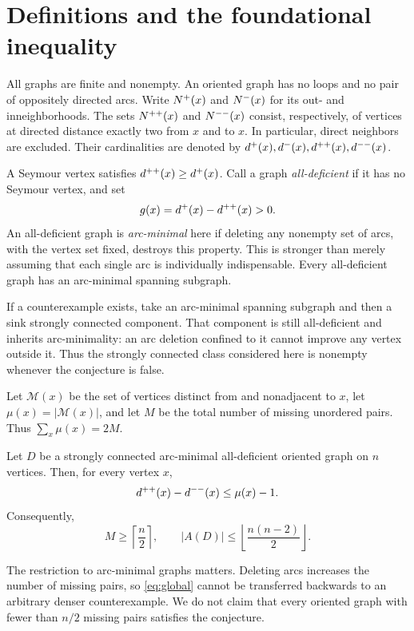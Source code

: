 \section{Definitions and the foundational inequality}

All graphs are finite and nonempty. An oriented graph has no loops and
no pair of oppositely directed arcs. Write $N^+(x)$ and $N^-(x)$ for
its out- and inneighborhoods. The sets $N^{++}(x)$ and $N^{--}(x)$ consist,
respectively, of vertices at directed distance exactly two from $x$ and
to $x$. In particular, direct neighbors are excluded. Their cardinalities
are denoted by $d^+(x),d^-(x),d^{++}(x),d^{--}(x)$.

A Seymour vertex satisfies $d^{++}(x)\ge d^+(x)$. Call a graph
\emph{all-deficient} if it has no Seymour vertex, and set
\[
g(x)=d^+(x)-d^{++}(x)>0.
\]
An all-deficient graph is \emph{arc-minimal} here if deleting any nonempty
set of arcs, with the vertex set fixed, destroys this property.
This is stronger than merely assuming that each single arc is
individually indispensable. Every all-deficient graph has an
arc-minimal spanning subgraph.

If a counterexample exists, take an arc-minimal spanning subgraph and
then a sink strongly connected component. That component is still
all-deficient and inherits arc-minimality: an arc deletion confined to it
cannot improve any vertex outside it. Thus the strongly connected class
considered here is nonempty whenever the conjecture is false.

Let $\mathcal M(x)$ be the set of vertices distinct from and
nonadjacent to $x$, let $\mu(x)=|\mathcal M(x)|$, and let $M$ be the
total number of missing unordered pairs. Thus $\sum_x\mu(x)=2M$.

\begin{theorem}\label{thm:main}
Let $D$ be a strongly connected arc-minimal all-deficient oriented graph
on $n$ vertices. Then, for every vertex $x$,
\begin{equation}\label{eq:main}
d^{++}(x)-d^{--}(x)\le\mu(x)-1.
\end{equation}
Consequently,
\begin{equation}\label{eq:global}
M\ge\left\lceil\frac n2\right\rceil,\qquad
|A(D)|\le\left\lfloor\frac{n(n-2)}2\right\rfloor.
\end{equation}
\end{theorem}

The restriction to arc-minimal graphs matters. Deleting arcs increases
the number of missing pairs, so \eqref{eq:global} cannot be transferred
backwards to an arbitrary denser counterexample. We do not claim that
every oriented graph with fewer than $n/2$ missing pairs satisfies the
conjecture.


